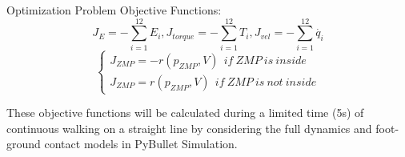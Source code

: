 \documentclass[aspectratio=169,t,xcolor=table]{beamer}
\begin{document}
\begin{frame}{Optimization Problem}
Objective Functions:
\begin{equation}
J_E=-\sum_{i=1}^{12}E_i , J_{torque}=-\sum_{i=1}^{12}T_i , J_{vel}=-\sum_{i=1}^{12}\dot{q_i}  
\end{equation}
\begin{equation}
        \left\{
            \begin{matrix}
                J_{ZMP}=-r(p_{ZMP}, V)\ \ {if\ ZMP\ is\ inside}\\ 
                J_{ZMP}=r(p_{ZMP}, V)\ \ {if\ ZMP\ is\ not\ inside}
            \end{matrix}
        \right.
        \end{equation}
    \vspace{3mm}
    
These objective functions will be calculated during a
limited time (5s) of continuous walking on a straight
line by considering the full dynamics and foot-ground contact
models in PyBullet Simulation.
\end{frame}
\end{document}
